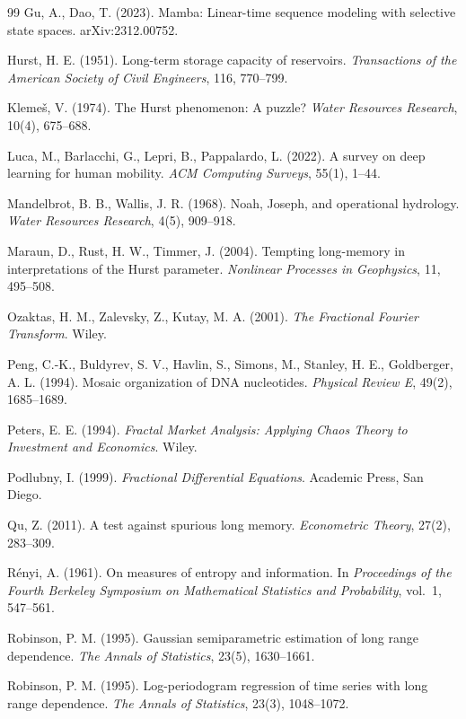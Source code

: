 \begin{thebibliography}{99}
Gu, A., Dao, T. (2023).
Mamba: Linear-time sequence modeling with selective state spaces.
arXiv:2312.00752.

Hurst, H. E. (1951).
Long-term storage capacity of reservoirs.
\emph{Transactions of the American Society of Civil Engineers}, 116, 770--799.

Kleme\v{s}, V. (1974).
The Hurst phenomenon: A puzzle?
\emph{Water Resources Research}, 10(4), 675--688.

Luca, M., Barlacchi, G., Lepri, B., Pappalardo, L. (2022).
A survey on deep learning for human mobility.
\emph{ACM Computing Surveys}, 55(1), 1--44.

Mandelbrot, B. B., Wallis, J. R. (1968).
Noah, Joseph, and operational hydrology.
\emph{Water Resources Research}, 4(5), 909--918.

Maraun, D., Rust, H. W., Timmer, J. (2004).
Tempting long-memory in interpretations of the Hurst parameter.
\emph{Nonlinear Processes in Geophysics}, 11, 495--508.

Ozaktas, H. M., Zalevsky, Z., Kutay, M. A. (2001).
\emph{The Fractional Fourier Transform}.
Wiley.

Peng, C.-K., Buldyrev, S. V., Havlin, S., Simons, M., Stanley, H. E., Goldberger, A. L. (1994).
Mosaic organization of DNA nucleotides.
\emph{Physical Review E}, 49(2), 1685--1689.

Peters, E. E. (1994).
\emph{Fractal Market Analysis: Applying Chaos Theory to Investment and Economics}.
Wiley.

Podlubny, I. (1999).
\emph{Fractional Differential Equations}.
Academic Press, San Diego.

Qu, Z. (2011).
A test against spurious long memory.
\emph{Econometric Theory}, 27(2), 283--309.

Rényi, A. (1961).
On measures of entropy and information.
In \emph{Proceedings of the Fourth Berkeley Symposium on Mathematical Statistics and Probability}, vol.~1, 547--561.

Robinson, P. M. (1995).
Gaussian semiparametric estimation of long range dependence.
\emph{The Annals of Statistics}, 23(5), 1630--1661.

Robinson, P. M. (1995).
Log-periodogram regression of time series with long range dependence.
\emph{The Annals of Statistics}, 23(3), 1048--1072.


\end{thebibliography}
